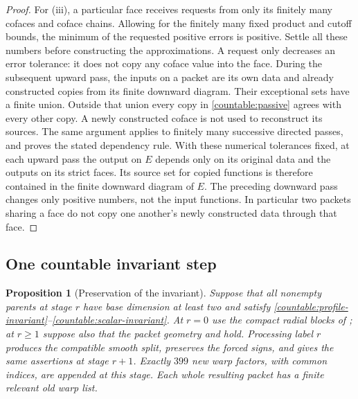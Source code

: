 \documentclass[11pt]{article}
\numberwithin{equation}{section}
\newtheorem{proposition}[theorem]{Proposition}
\theoremstyle{definition}
\theoremstyle{remark}
\begin{document}
\begin{proof}
For (iii), a particular face receives requests from only its finitely
many cofaces and coface chains. Allowing for the finitely many fixed
product and cutoff bounds, the minimum of the requested positive
errors is positive. Settle all these numbers before constructing the
approximations. A request only decreases an error tolerance: it does
not copy any coface value into the face. During the subsequent upward
pass, the inputs on a packet are its own data and already constructed
copies from its finite downward diagram. Their exceptional sets have
a finite union. Outside that union every copy in
\eqref{countable:passive} agrees with every other copy. A newly
constructed coface is not used to reconstruct its sources. The same
argument applies to finitely many successive directed passes, and
proves the stated dependency rule.
With these numerical tolerances fixed, at each upward pass the output
on $E$ depends only on its original data and the outputs on its strict
faces. Its source set for copied functions is therefore contained in
the finite downward diagram of $E$. The preceding downward pass changes only positive
numbers, not the input functions. In particular two packets sharing
a face do not copy one another's newly constructed data through that face.
\end{proof}

\subsection{One countable invariant step}

\begin{proposition}[Preservation of the invariant]\label{countable:step}
Suppose that all nonempty parents at stage $r$ have base dimension at
least two and satisfy \eqref{countable:profile-invariant}--\eqref{countable:scalar-invariant}.
At $r=0$ use the compact radial blocks of ; at
$r\ge1$ suppose also that the packet geometry and
 hold. Processing label $r$ produces the
compatible smooth split, preserves the forced signs, and gives the
same assertions at stage $r+1$. Exactly $399$ new warp factors, with
common indices, are appended at this stage. Each whole resulting
packet has a finite relevant old warp list.
\end{proposition}
\end{document}

